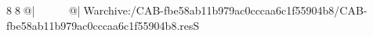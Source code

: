 8  8  @|                                                   @| W   archive:/CAB-fbe58ab11b979ac0cccaa6c1f55904b8/CAB-fbe58ab11b979ac0cccaa6c1f55904b8.resS 